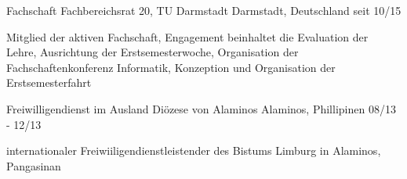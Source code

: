 \begin{cventries}
  \cventry
    {Fachschaft} %
    {Fachbereichsrat 20, TU Darmstadt} %
    {Darmstadt, Deutschland} %
    {seit 10/15} %
    {
    \begin{cvitems}
        \item {Mitglied der aktiven Fachschaft, Engagement beinhaltet die Evaluation der Lehre, Ausrichtung der Erstsemesterwoche, Organisation der Fachschaftenkonferenz Informatik, Konzeption und Organisation der Erstsemesterfahrt}
    \end{cvitems}
    }

  \cventry
    {Freiwilligendienst im Ausland} %
    {Diözese von Alaminos} %
    {Alaminos, Phillipinen} %
    {08/13 - 12/13} %
    {
      \begin{cvitems} %
        \item {internationaler Freiwiiligendienstleistender des Bistums Limburg in Alaminos, Pangasinan}
      \end{cvitems}
    }

\end{cventries}
